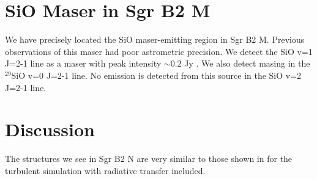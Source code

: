 \documentclass[twocolumn]{aastex61}
\begin{document}
\section{SiO Maser in Sgr B2 M}
We have precisely located the SiO maser-emitting region in Sgr B2 M.  Previous
observations of this maser \citep{Morita1992a,Shika1997a} had poor astrometric
precision.
We detect the SiO v=1 J=2-1 line as a maser with peak intensity $\sim0.2$ Jy \perbeam.
We also detect masing in the $^{29}$SiO v=0 J=2-1 line.
No emission is detected from this source in the SiO v=2 J=2-1 line.


\section{Discussion}
The structures we see in Sgr B2 N are very similar to those shown in \citet{Rosen2016a}
for the turbulent simulation with radiative transfer included.
\end{document}
